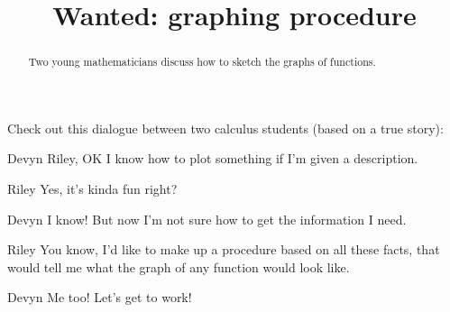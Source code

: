 \documentclass{ximera}
\title[Break-Ground:]{Wanted: graphing procedure}
\begin{document}
\begin{abstract}
Two young mathematicians discuss how to sketch the graphs of functions.
\end{abstract}
\maketitle

Check out this dialogue between two calculus students (based on a true
story):

\begin{dialogue}
\item[Devyn] Riley, OK I know how to plot something if I'm given a description.
\item[Riley] Yes, it's kinda fun right?
\item[Devyn] I know!  But now I'm not sure how to get the information I need.
\item[Riley] You know, I'd like to make up a procedure based on all
  these facts, that would tell me what the graph of any function would look like.
\item[Devyn] Me too! Let's get to work!
\end{dialogue}
\end{document}
